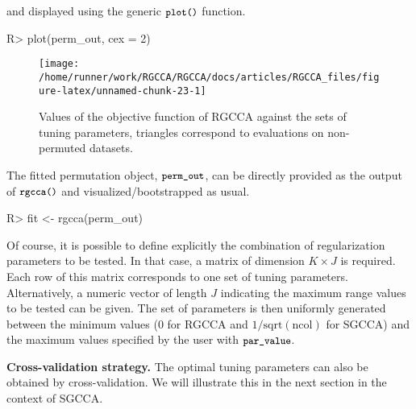 \documentclass[
]{jss}
\begin{document}
\normalsize

and displayed using the generic \(\small{\texttt{plot()}}\) function.

\footnotesize

\begin{CodeChunk}
\begin{CodeInput}
R> plot(perm_out, cex = 2)
\end{CodeInput}
\begin{figure}[H]

{\centering \texttt{[image: /home/runner/work/RGCCA/RGCCA/docs/articles/RGCCA\_files/figure-latex/unnamed-chunk-23-1]} 

}

\caption[Values of the objective function of RGCCA against the sets of tuning parameters, triangles correspond to evaluations on non-permuted datasets]{Values of the objective function of RGCCA against the sets of tuning parameters, triangles correspond to evaluations on non-permuted datasets.}\label{fig:unnamed-chunk-23}
\end{figure}
\end{CodeChunk}

\normalsize

The fitted permutation object, \(\small{\texttt{perm\_out}}\), can be
directly provided as the output of \(\small{\texttt{rgcca()}}\) and
visualized/bootstrapped as usual.

\footnotesize

\begin{CodeChunk}
\begin{CodeInput}
R> fit <- rgcca(perm_out)
\end{CodeInput}
\end{CodeChunk}

\normalsize

Of course, it is possible to define explicitly the combination of
regularization parameters to be tested. In that case, a matrix of
dimension \(K \times J\) is required. Each row of this matrix
corresponds to one set of tuning parameters. Alternatively, a numeric
vector of length \(J\) indicating the maximum range values to be tested
can be given. The set of parameters is then uniformly generated between
the minimum values (0 for RGCCA and \(1/\text{sqrt}(\text{ncol})\) for
SGCCA) and the maximum values specified by the user with
\(\small{\texttt{par\_value}}\).

\textbf{Cross-validation strategy.} The optimal tuning parameters can
also be obtained by cross-validation. We will illustrate this in the
next section in the context of SGCCA.
\end{document}
